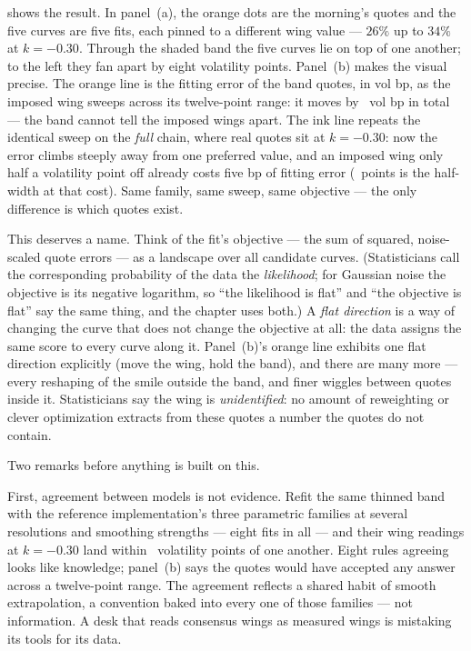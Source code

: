  shows the result.  In panel~(a), the orange dots are the morning's quotes and the five
curves are five fits, each pinned to a different wing value ---
$26\%$ up to $34\%$ at $k=-0.30$.  Through the shaded band the five
curves lie on top of one another; to the left they fan apart by
eight volatility points.  Panel~(b) makes the visual precise.  The
orange line is the fitting error of the band quotes, in vol bp, as
the imposed wing sweeps across its twelve-point range: it moves by
\MacPriorFlatValleyBp\ vol bp in total --- the band cannot tell the
imposed wings apart.  The ink line repeats the identical sweep on
the \emph{full} chain, where real quotes sit at $k=-0.30$: now the
error climbs steeply away from one preferred value, and an imposed
wing only half a volatility point off already costs five bp of
fitting error (\MacPriorFlatVHalfPts\ points is the half-width at
that cost).  Same family, same sweep, same objective --- the only
difference is which quotes exist.

This deserves a name.  Think of the fit's objective --- the sum of
squared, noise-scaled quote errors --- as a landscape over all
candidate curves.  (Statisticians call the corresponding probability
of the data the \emph{likelihood}; for Gaussian noise the objective
is its negative logarithm, so ``the likelihood is flat'' and ``the
objective is flat'' say the same thing, and the chapter uses both.)  A \emph{flat direction} is a way of changing the
curve that does not change the objective at all: the data assigns
the same score to every curve along it.  Panel~(b)'s orange line
exhibits one flat direction explicitly (move the wing, hold the
band), and there are many more --- every reshaping of the smile
outside the band, and finer wiggles between quotes inside it.
Statisticians say the wing is \emph{unidentified}: no amount of
reweighting or clever optimization extracts from these quotes a
number the quotes do not contain.

Two remarks before anything is built on this.

First, agreement between models is not evidence.  Refit the same
thinned band with the reference implementation's three parametric
families at several resolutions and smoothing strengths ---
eight fits in all --- and their wing readings at $k=-0.30$ land
within \MacPriorFlatEnsembleSpreadPts\ volatility points of one
another.  Eight rules agreeing looks like knowledge; panel~(b) says
the quotes would have accepted any answer across a twelve-point
range.  The agreement reflects a shared habit of smooth
extrapolation, a convention baked into every one of those families
--- not information.  A desk that reads consensus wings as measured
wings is mistaking its tools for its data.

